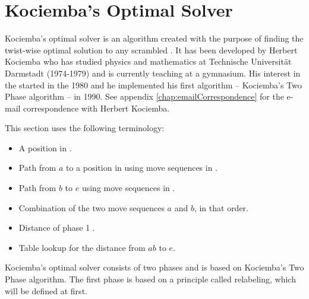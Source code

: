 \section{Kociemba's Optimal Solver}
\label{sec:kociemba}
Kociemba's optimal solver is an algorithm created with the purpose of finding the twist-wise optimal solution to any scrambled \rubik{} \cite{kociemba09} \cite{cubelovers92}. It has been developed by Herbert Kociemba who has studied physics and mathematics at Technische Universit\"{a}t Darmstadt \cite{TUD} (1974-1979) and is currently teaching at a gymnasium. His interest in the \rubik{} started in the 1980 and he implemented his first algorithm -- Kociemba's Two Phase algorithm -- in 1990. See appendix  \ref{chap:emailCorrespondence} for the e-mail correspondence with Herbert Kociemba.

This section uses the following terminology:
\begin{itemize}
\item {}A position in .
\item {}Path from $a$ to a position in  using move sequences in .
\item {}Path from $b$ to $e$ using move sequences in .
\item {}Combination of the two move sequences $a$ and $b$, in that order.
\item {}Distance of phase 1 .
\item {}Table lookup for the distance from $ab$ to $e$.
\end{itemize}
Kociemba's optimal solver consists of two phases and is based on Kociemba's Two Phase algorithm. The first phase is based on a principle called relabeling, which will be defined at first. 


